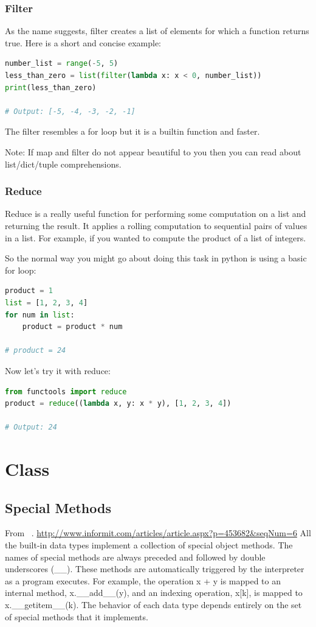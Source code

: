 \documentclass[../main.tex]{subfiles}
\begin{document}
\subsubsection{Filter}

As the name suggests, filter creates a list of elements for which a function returns true. Here is a short and concise example:
\begin{lstlisting}[language=Python]
number_list = range(-5, 5)
less_than_zero = list(filter(lambda x: x < 0, number_list))
print(less_than_zero)

# Output: [-5, -4, -3, -2, -1]
\end{lstlisting}
The filter resembles a for loop but it is a builtin function and faster.

Note: If map and filter do not appear beautiful to you then you can read about list/dict/tuple comprehensions.
\subsubsection{Reduce}

Reduce is a really useful function for performing some computation on a list and returning the result. It applies a rolling computation to sequential pairs of values in a list. For example, if you wanted to compute the product of a list of integers.

So the normal way you might go about doing this task in python is using a basic for loop:
\begin{lstlisting}[language=Python]
product = 1
list = [1, 2, 3, 4]
for num in list:
    product = product * num

# product = 24

\end{lstlisting}
Now let’s try it with reduce:
\begin{lstlisting}[language=Python]
from functools import reduce
product = reduce((lambda x, y: x * y), [1, 2, 3, 4])

# Output: 24
\end{lstlisting}
\section{Class}
\subsection{Special Methods}
From ~\cite{beazley2009python}. \url{http://www.informit.com/articles/article.aspx?p=453682&seqNum=6} All the built-in data types implement a collection of special object methods. The names of special methods are always preceded and followed by double underscores (\_\_). These methods are automatically triggered by the interpreter as a program executes. For example, the operation x + y is mapped to an internal method, x.\_\_add\_\_(y), and an indexing operation, x[k], is mapped to x.\_\_getitem\_\_(k). The behavior of each data type depends entirely on the set of special methods that it implements.
\end{document}
